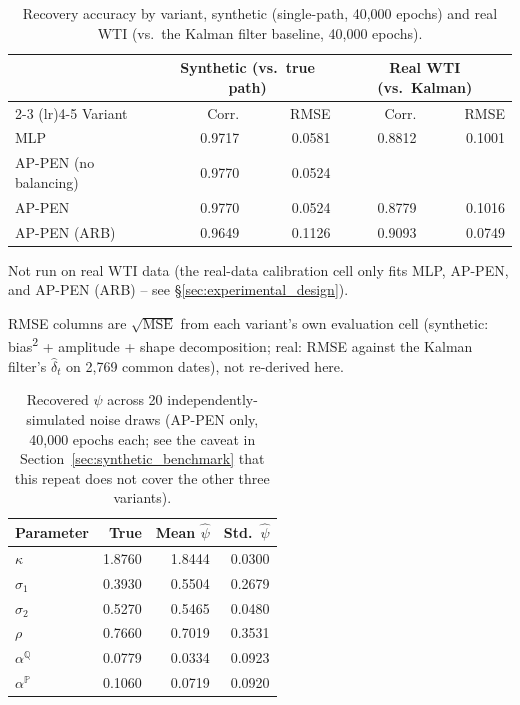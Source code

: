 \documentclass[11pt, a4paper]{article}
\begin{document}
\begin{table}[htbp]
\centering
\begin{threeparttable}
\caption{Recovery accuracy by variant, synthetic (single-path, 40{,}000 epochs)
and real WTI (vs.\ the Kalman filter baseline, 40{,}000 epochs).}
\label{tab:variant_accuracy}
\begin{tabular}{@{}lrrrr@{}}
\toprule
& \multicolumn{2}{c}{Synthetic (vs.\ true path)} & \multicolumn{2}{c}{Real WTI (vs.\ Kalman)} \\
\cmidrule(lr){2-3} \cmidrule(lr){4-5}
Variant & Corr. & RMSE & Corr. & RMSE \\
\midrule
MLP                    & 0.9717 & 0.0581 & 0.8812 & 0.1001 \\
AP-PEN (no balancing)  & 0.9770 & 0.0524 & \tnote{a} & \tnote{a} \\
AP-PEN                 & 0.9770 & 0.0524 & 0.8779 & 0.1016 \\
AP-PEN (ARB)           & 0.9649 & 0.1126 & 0.9093 & 0.0749 \\
\bottomrule
\end{tabular}
\begin{tablenotes}
\footnotesize
\item[a] Not run on real WTI data (the real-data calibration cell only fits MLP, AP-PEN, and AP-PEN (ARB) -- see \S\ref{sec:experimental_design}).
\item RMSE columns are $\sqrt{\text{MSE}}$ from each variant's own evaluation cell (synthetic: bias\textsuperscript{2} + amplitude + shape decomposition; real: RMSE against the Kalman filter's $\hat\delta_t$ on 2,769 common dates), not re-derived here.
\end{tablenotes}
\end{threeparttable}
\end{table}

\begin{table}[htbp]
\centering
\caption{Recovered $\psi$ across 20 independently-simulated noise draws
(AP-PEN only, 40{,}000 epochs each; see the caveat in
Section~\ref{sec:synthetic_benchmark} that this repeat does not cover the
other three variants).}
\label{tab:psi_repeat}
\begin{tabular}{@{}lrrr@{}}
\toprule
Parameter & True & Mean $\hat\psi$ & Std.\ $\hat\psi$ \\
\midrule
$\kappa$            & 1.8760 & 1.8444 & 0.0300 \\
$\sigma_1$          & 0.3930 & 0.5504 & 0.2679 \\
$\sigma_2$          & 0.5270 & 0.5465 & 0.0480 \\
$\rho$              & 0.7660 & 0.7019 & 0.3531 \\
$\alpha^{\mathbb{Q}}$ & 0.0779 & 0.0334 & 0.0923 \\
$\alpha^{\mathbb{P}}$ & 0.1060 & 0.0719 & 0.0920 \\
\bottomrule
\end{tabular}
\end{table}
\end{document}
